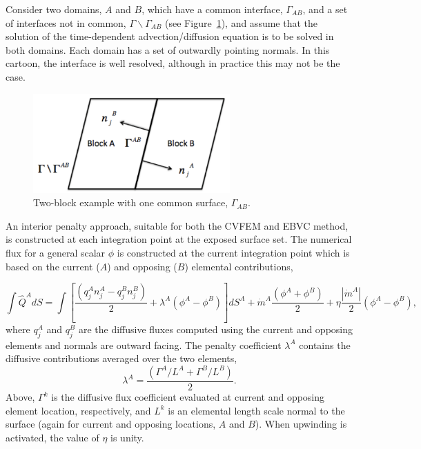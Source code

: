 {Consider two domains, $A$ and $B$, which have a common interface, $\Gamma_{AB}$,
and a set of interfaces not in common, $\Gamma \backslash \Gamma_{AB}$
(see Figure~\ref{domainAB}), and assume that the solution of the 
time-dependent advection/diffusion equation is to be solved in both domains. 
Each domain has a set of outwardly pointing normals. In this cartoon, the interface 
is well resolved, although in practice this may not be the case. 


\begin{figure} 
  \centerline{\includegraphics[height=1.5in]{images/twoBlockDiag.pdf}} 
 \caption{Two-block example with one common surface, $\Gamma_{AB}$.} 
 \label{domainAB} 
\end{figure}    

An interior penalty approach, suitable for both the CVFEM and EBVC method, is constructed 
at each integration point at the exposed surface set. The numerical flux for a general 
scalar $\phi$ is constructed at the current integration point which is based on the current 
($A$) and opposing ($B$) elemental contributions,

\begin{equation} 
  \int \hat Q^A dS = \int [\frac{(q_j^A n_j^A - q_j^B n_j^B)}{2}
       + \lambda^A ( \phi^A - \phi^B) ]dS^A
       + \dot m^A \frac{(\phi^A + \phi^B)}{2} 
       + \eta \frac{|\dot{m}^A|}{2} (\phi^A - \phi^B),
\label{numericalFluxA}
\end{equation}
where $q_j^A$ and $q_j^B$ are the diffusive fluxes computed using the current 
and opposing elements and normals are outward facing. The penalty coefficient $\lambda^A$ contains the diffusive 
contributions averaged over the two elements,
\begin{equation} 
        \lambda^A = \frac{(\Gamma^A / L^A + \Gamma^B / L^B )}{2}.
\label{lamdbaA}
\end{equation}
Above, $\Gamma^k$ is the diffusive flux coefficient evaluated at current and opposing element location, respectively, 
and $L^k$ is an elemental length scale normal to the surface (again for current and opposing locations, $A$ and $B$). 
When upwinding is activated, the value of $\eta$ is unity. 

}
